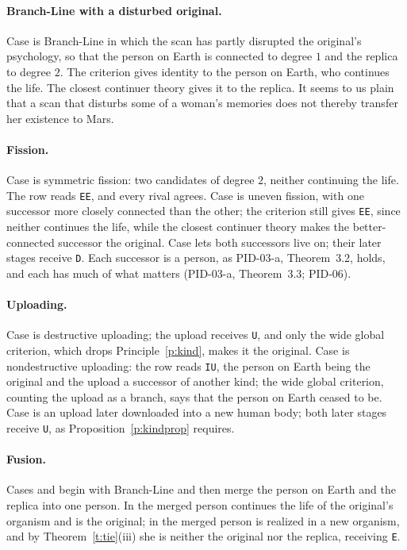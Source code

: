 \documentclass{situationist-preprint}
\begin{document}
\paragraph{Branch-Line with a disturbed original.} Case \caseBranchLineWeak{} is Branch-Line in which the scan has partly disrupted the original's psychology, so that the person on Earth is connected to degree $1$ and the replica to degree $2$. The criterion gives identity to the person on Earth, who continues the life. The closest continuer theory gives it to the replica. It seems to us plain that a scan that disturbs some of a woman's memories does not thereby transfer her existence to Mars.

\paragraph{Fission.} Case \caseFission{} is symmetric fission: two candidates of degree $2$, neither continuing the life. The row reads \texttt{EE}, and every rival agrees. Case \caseFissionUneven{} is uneven fission, with one successor more closely connected than the other; the criterion still gives \texttt{EE}, since neither continues the life, while the closest continuer theory makes the better-connected successor the original. Case \caseFissionLater{} lets both successors live on; their later stages receive \texttt{D}. Each successor is a person, as PID-03-a, Theorem~3.2, holds, and each has much of what matters (PID-03-a, Theorem~3.3; PID-06).

\paragraph{Uploading.} Case \caseUploadD{} is destructive uploading; the upload receives \texttt{U}, and only the wide global criterion, which drops Principle~\ref{p:kind}, makes it the original. Case \caseUploadN{} is nondestructive uploading: the row reads \texttt{IU}, the person on Earth being the original and the upload a successor of another kind; the wide global criterion, counting the upload as a branch, says that the person on Earth ceased to be. Case \caseUploadDownload{} is an upload later downloaded into a new human body; both later stages receive \texttt{U}, as Proposition~\ref{p:kindprop} requires.

\paragraph{Fusion.} Cases \caseFusionLife{} and \caseFusionNone{} begin with Branch-Line and then merge the person on Earth and the replica into one person. In \caseFusionLife{} the merged person continues the life of the original's organism and is the original; in \caseFusionNone{} the merged person is realized in a new organism, and by Theorem~\ref{t:tie}(iii) she is neither the original nor the replica, receiving \texttt{E}.
\end{document}
